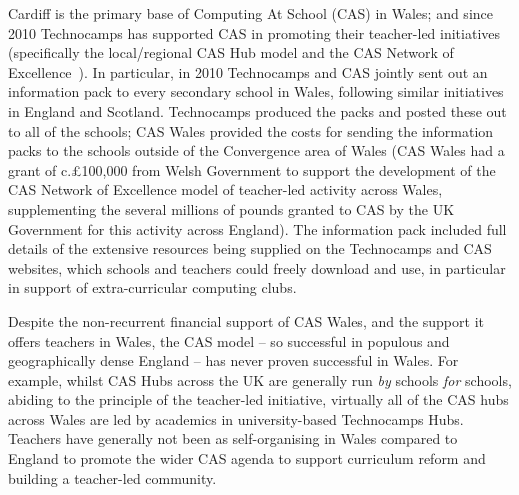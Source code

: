\documentclass[conference]{IEEEtran}
\begin{document}
Cardiff is the primary base of Computing At School (CAS) in Wales; and
since 2010 Technocamps has supported CAS in promoting their
teacher-led initiatives (specifically the local/regional CAS Hub model
and the CAS Network of
Excellence~\cite{brown-et-al-toce2014,sentance-et-al-wipsce2014}).
In particular, in 2010 Technocamps and CAS jointly sent out an
information pack to every secondary school in Wales, following similar
initiatives in England and Scotland. Technocamps produced the packs
and posted these out to all of the schools; CAS Wales provided the
costs for sending the information packs to the schools outside of the
Convergence area of Wales (CAS Wales had a grant of c.\pounds100,000
from Welsh Government to support the development of the CAS Network of
Excellence model of teacher-led activity across Wales, supplementing
the several millions of pounds granted to CAS by the UK Government for
this activity across England).  The information pack included full
details of the extensive resources being supplied on the Technocamps
and CAS websites, which schools and teachers could freely download and
use, in particular in support of extra-curricular computing clubs.

 

Despite the non-recurrent financial support of CAS Wales, and the
support it offers teachers in Wales, the CAS model -- so successful in
populous and geographically dense England -- has never proven
successful in Wales.  For example, whilst CAS Hubs across the UK are
generally run \emph{by} schools \emph{for} schools, abiding to the
principle of the teacher-led initiative, virtually all of the CAS hubs
across Wales are led by academics in university-based Technocamps Hubs.
Teachers have generally not been as self-organising in Wales compared
to England to promote the wider CAS agenda to support
curriculum reform and building a teacher-led community.
\end{document}
